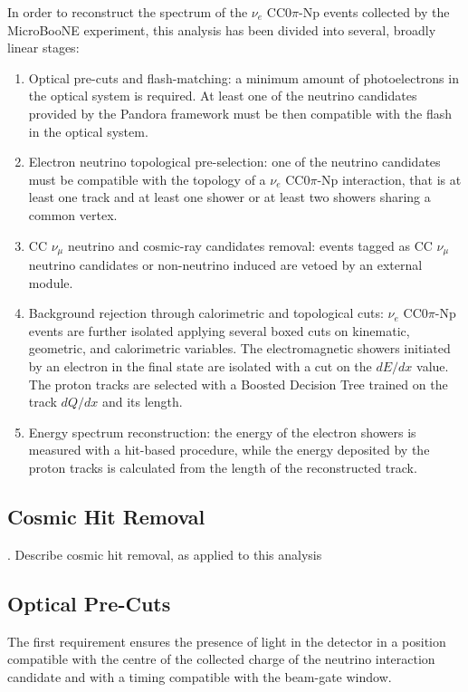 In order to reconstruct the spectrum of the $\nu_{e}$ CC0$\pi$-Np events collected by the MicroBooNE experiment, this analysis has been divided into several, broadly linear stages:
\begin{enumerate}
\item Optical pre-cuts and flash-matching: a minimum amount of photoelectrons in the optical system is required. At least one of the neutrino candidates provided by the Pandora framework must be then compatible with the flash in the optical system.
\item Electron neutrino topological pre-selection: one of the neutrino candidates must be compatible with the topology of a $\nu_{e}$ CC0$\pi$-Np interaction, that is at least one track and at least one shower or at least two showers sharing a common vertex.
\item CC $\nu_{\mu}$ neutrino and cosmic-ray candidates removal: events tagged as CC $\nu_{\mu}$ neutrino candidates or non-neutrino induced are vetoed by an external module.
\item Background rejection through calorimetric and topological cuts: $\nu_{e}$ CC0$\pi$-Np events are further isolated applying several boxed cuts on kinematic, geometric, and calorimetric variables. The electromagnetic showers initiated by an electron in the final state are isolated with a cut on the $dE/dx$ value. The proton tracks are selected with a Boosted Decision Tree trained on the track $dQ/dx$ and its length.
\item Energy spectrum reconstruction: the energy of the electron showers is measured with a hit-based procedure, while the energy deposited by the proton tracks is calculated from the length of the reconstructed track. 
\end{enumerate}

\subsection{Cosmic Hit Removal}
.  Describe cosmic hit removal, as applied to this analysis

\subsection{Optical Pre-Cuts}

The first requirement ensures the presence of light in the detector in a position compatible with the centre of the collected charge of the neutrino interaction candidate and with a timing compatible with the beam-gate window.

